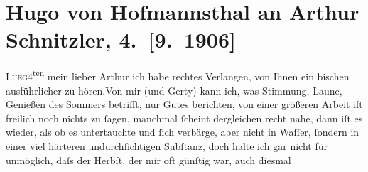 

         
         \renewcommand{\erwaehntePersonen}{Personen: Otto Brahm, Gertrude von Hofmannsthal, Christiane von Hofmannsthal, Raimund von Hofmannsthal, Franz von Hofmannsthal}
         \renewcommand{\erwaehnteOrte}{Orte: Lueg am Wolfgangsee, Rodaun, Semmering, St. Gilgen, Wien}
         \renewcommand{\erwaehnteWerke}{}
               \section[Hugo von Hofmannsthal an Arthur Schnitzler, 4. {[}9. 1906{]}]{ Hugo von Hofmannsthal an Arthur Schnitzler, 4. {[}9. 1906{]}}\nopagebreak{}\rehead{ }\begin{ledgroupsized}[t]{13cm}\normalsize\beginnumbering \toendnotes[C]{\smallbreak\pagebreak[2]} 
\toendnotes[C]{\smallbreak}\pstart
           \raggedleft{}{\pb}\textsc{Lueg}4\textsuperscript{ten}\pend
           \pstart{}mein lieber Arthur \pend\pstart
           ich habe rechtes Verlangen, von Ihnen ein bischen ausführlicher zu hören.\hspace*{1.5em}Von mir (und Gerty) kann ich, was Stimmung, Laune, Genießen des Sommers betrifft, nur
               Gutes berichten, von einer größeren Arbeit iſt freilich noch nichts zu ſagen,
               manchmal {\pb}ſcheint dergleichen
               recht nahe, dann iſt es wieder, als ob es untertauchte und ſich verbärge, aber nicht
               in Waſſer, ſondern in einer viel härteren undurchſichtigen Subſtanz, doch halte ich
               gar nicht für unmöglich, daſs der Herbſt, der mir oft günſtig war, auch diesmal

\end{ledgroupsized}
